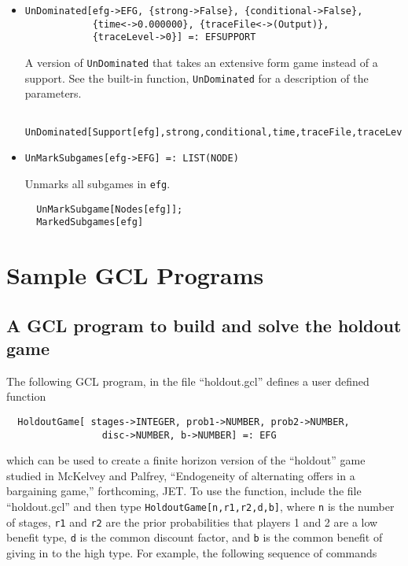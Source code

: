 \begin{itemize}
\item{}
\protect \large \begin{verbatim}
UnDominated[efg->EFG, {strong->False}, {conditional->False}, 
            {time<->0.000000}, {traceFile<->(Output)}, 
            {traceLevel->0}] =: EFSUPPORT 
\end{verbatim}\normalsize

\bd 
A version of \verb+UnDominated+ that takes an extensive form game instead
of a support.  See the built-in function, \verb+UnDominated+ for a
description of the parameters.
\begin{verbatim}
  UnDominated[Support[efg],strong,conditional,time,traceFile,traceLevel]
\end{verbatim} 
\ed

\item{}
\protect \large \begin{verbatim}
UnMarkSubgames[efg->EFG] =: LIST(NODE)
\end{verbatim}\normalsize

\bd 
Unmarks all subgames in \verb+efg+.
\begin{verbatim}
  UnMarkSubgame[Nodes[efg]];
  MarkedSubgames[efg]
\end{verbatim} 
\ed






\end{itemize}

\appendix
\chapter{Sample GCL Programs}
\pagestyle{headings}

\section{A GCL program to build and solve the holdout game}

The following GCL program, in the file ``holdout.gcl'' defines a user
defined function

\begin{verbatim}
  HoldoutGame[ stages->INTEGER, prob1->NUMBER, prob2->NUMBER, 
                 disc->NUMBER, b->NUMBER] =: EFG
\end{verbatim}

\noindent
which can be used to create a finite horizon version of the
``holdout'' game studied in McKelvey and Palfrey, ``Endogeneity of
alternating offers in a bargaining game,'' forthcoming, JET.  To use
the function, include the file ``holdout.gcl'' and then type
\verb+HoldoutGame[n,r1,r2,d,b]+, where \verb+n+ is the number of
stages, \verb+r1+ and \verb+r2+ are the prior probabilities that
players 1 and 2 are a low benefit type, \verb+d+ is the common
discount factor, and \verb+b+ is the common benefit of giving in to
the high type.  For example, the following sequence of commands

